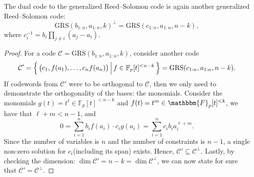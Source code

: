 \begin{theorem}\label{thm:w7_dual_GRS}
    The dual code to the generalized Reed--Solomon code is again another generalized Reed--Solomon code:
    \begin{equation}
        \mathrm{GRS}(b_{1:n},a_{1:n},k)^\perp = \mathrm{GRS}(c_{1:n},a_{1:n},n-k),
    \end{equation}
    where $c_i^{-1} = b_i\prod_{j\neq i}(a_j-a_i)$.
\end{theorem}
\begin{proof}
    For a code $\mathcal{C} = \mathrm{GRS}(b_{1:n},a_{1:n},k)$, consider another code $$\mathcal{C}' = \left\{\,{\left(c_1,f(a_1),\ldots,c_nf(a_n)\right)}\,\middle\vert\,{ f\in \mathbb{F}_p[t]^{<n-k}}\,\right\} = \mathrm{GRS}(c_{1:n},a_{1:n},n-k).$$ If codewords from $\mathcal{C}'$ were to be orthogonal to $\mathcal{C}$, then we only need to demonstrate the orthogonality of the bases: the monomials. Consider the monomials $g(t) = t^\ell \in \mathbb{F}_p[t]^{<n-k}$ and $f(t) = t^m \in \mathbbm{F}_p[t]^{<k}$, we have that $\ell+m<n-1$, and 
    \begin{equation*}
        0 = \sum_{i=1}^n b_if(a_i) \cdot c_ig(a_i) = \sum_{i=1}^n c_ib_i a_i^{\ell+m}.
    \end{equation*}
    Since the number of variables is $n$ and the number of constraints is $n-1$, a single non-zero solution for $c_i$(including its span) exists. Hence, $\mathcal{C}'\subseteq \mathcal{C}^\perp$. Lastly, by checking the dimension: $\dim\mathcal{C}' = n-k = \dim\mathcal{C}^\perp$, we can now state for sure that $\mathcal{C}'=\mathcal{C}^\perp$.


\end{proof}

